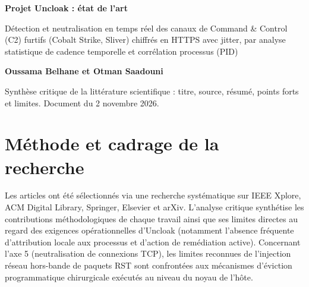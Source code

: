 \documentclass[10pt,a4paper]{article}
\begin{document}
{\LARGE \textbf{Projet Uncloak : état de l'art}}\par\vspace{2mm}
{\large Détection et neutralisation en temps réel des canaux de Command \& Control (C2) furtifs (Cobalt Strike, Sliver) chiffrés en HTTPS avec jitter, par analyse statistique de cadence temporelle et corrélation processus (PID)}\par\vspace{3mm}
{\large \textbf{Oussama Belhane et Otman Saadouni}}\par\vspace{1.5mm}
{\color{darkgray} Synthèse critique de la littérature scientifique : titre, source, résumé, points forts et limites. Document du 2 novembre 2026.}\par\vspace{4mm}

\section*{Méthode et cadrage de la recherche}
Les articles ont été sélectionnés via une recherche systématique sur IEEE Xplore, ACM Digital Library, Springer, Elsevier et arXiv. L'analyse critique synthétise les contributions méthodologiques de chaque travail ainsi que ses limites directes au regard des exigences opérationnelles d'Uncloak (notamment l'absence fréquente d'attribution locale aux processus et d'action de remédiation active). Concernant l'axe 5 (neutralisation de connexions TCP), les limites reconnues de l'injection réseau hors-bande de paquets RST sont confrontées aux mécanismes d'éviction programmatique chirurgicale exécutés au niveau du noyau de l'hôte.

\vspace{2mm}
\end{document}

